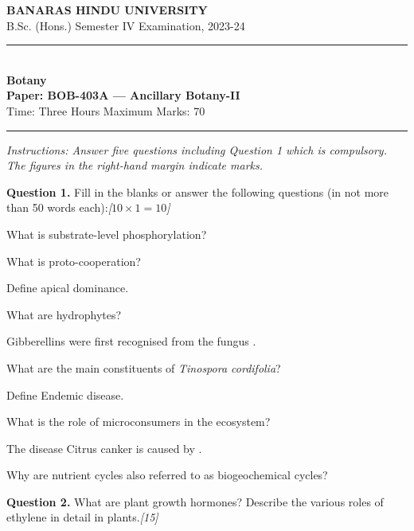 \documentclass[11pt,a4paper]{article}
\newcommand{\pts}[1]{\hfill   \textit{[#1]}}
\begin{document}
\begin{center}
  {\large\bfseries BANARAS HINDU UNIVERSITY}\\[2pt]
  {\normalsize B.Sc. (Hons.) Semester IV Examination, 2023-24}\\[6pt]
  \rule{0.8\linewidth}{0.5pt}\\[6pt]
  {\large\bfseries Botany}\\[4pt]
  {\large\bfseries Paper: BOB-403A --- Ancillary Botany-II}\\[4pt]
  {\normalsize Time: Three Hours \hfill Maximum Marks: 70}
\end{center}

\rule{\linewidth}{0.4pt}

\smallskip



\noindent   \textit{Instructions: Answer five questions including Question 1 which is compulsory. The figures in the right-hand margin indicate marks.}

\bigskip

\medskip


\noindent   \textbf{Question 1.} Fill in the blanks or answer the following questions (in not more than 50 words each):\pts{$10  \times 1 = 10$}

\begin{parts}
  \item What is substrate-level phosphorylation?
  \item What is proto-cooperation?
  \item Define apical dominance.
  \item What are hydrophytes?
  \item Gibberellins were first recognised from the fungus \makebox[3cm]{\hrulefill}.
  \item What are the main constituents of   \textit{Tinospora cordifolia}?
  \item Define Endemic disease.
  \item What is the role of microconsumers in the ecosystem?
  \item The disease Citrus canker is caused by \makebox[3cm]{\hrulefill}.
  \item Why are nutrient cycles also referred to as biogeochemical cycles?
\end{parts}

\medskip


\noindent   \textbf{Question 2.} What are plant growth hormones? Describe the various roles of ethylene in detail in plants.\pts{15}
\end{document}
